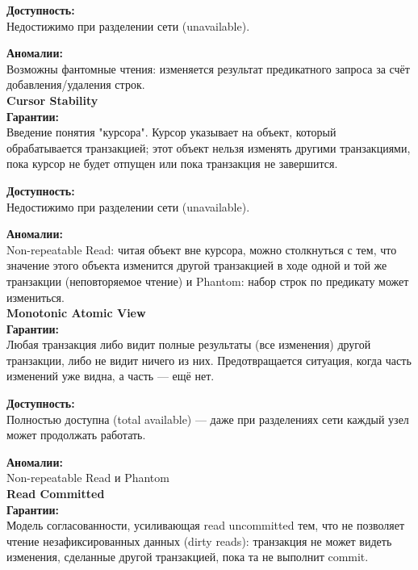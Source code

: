 \textbf{Доступность:}  ~\\
Недостижимо при разделении сети (unavailable).  

\textbf{Аномалии:}  ~\\
Возможны фантомные чтения: изменяется результат предикатного запроса за счёт добавления/удаления строк.\autocite{jepsen-repeatable-read}~\\

\textbf{Cursor Stability}~\\ 

\textbf{Гарантии:}  ~\\
Введение понятия "курсора". Курсор указывает на объект, который обрабатывается транзакцией; этот объект нельзя изменять другими транзакциями, 
пока курсор не будет отпущен или пока транзакция не завершится.

\textbf{Доступность:}  ~\\
Недостижимо при разделении сети (unavailable).  

\textbf{Аномалии:}  ~\\
Non-repeatable Read: читая объект вне курсора, можно столкнуться с тем, что значение этого объекта изменится другой транзакцией в ходе одной и той же транзакции (неповторяемое чтение) 
и Phantom: набор строк по предикату может измениться.\autocite{jepsen-cursor-stability}~\\

\textbf{Monotonic Atomic View}~\\

\textbf{Гарантии:}  ~\\
Любая транзакция либо видит полные результаты (все изменения) другой транзакции, либо не видит ничего из них.
Предотвращается ситуация, когда часть изменений уже видна, а часть — ещё нет.

\textbf{Доступность:}  ~\\
Полностью доступна (total available) — даже при разделениях сети каждый узел может продолжать работать.

\textbf{Аномалии:}  ~\\
Non-repeatable Read и Phantom \autocite{jepsen-monotonic-atomic-view}~\\

\textbf{Read Committed}~\\

\textbf{Гарантии:}  ~\\
Модель согласованности, усиливающая read uncommitted тем, что не позволяет чтение незафиксированных данных (dirty reads): транзакция не может видеть изменения, 
сделанные другой транзакцией, пока та не выполнит commit.

